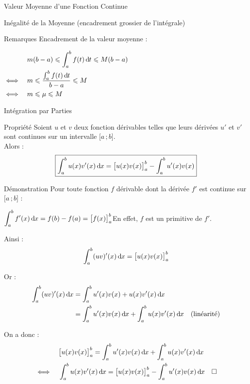 \documentclass{coursbook}
\begin{document}
\begin{Gpartie}{Valeur Moyenne d'une Fonction Continue}
\begin{Spartie}{Inégalité de la Moyenne (encadrement \og grossier \fg{} de l'intégrale)}
\begin{SSpartie}{Remarques}
                Encadrement de la valeur moyenne :

                $\begin{aligned}[t]
                    &\quad m(b-a)\leq\int_a^b f(t)\dt \leq M(b-a) \\
                    \iff&\quad m\leq\frac{\int_a^b f(t)\dt}{b-a}\leq M \\
                    \iff&\quad m\leq\mu\leq M
                \end{aligned}$
            \end{SSpartie}
        \end{Spartie}
    \end{Gpartie}
    \vfill
    \pagebreak
    \begin{Gpartie}{Intégration par Parties} 
        \begin{Spartie}{Propriété} 
            Soient $u$ et $v$ deux fonction dérivables telles que leurs dérivées $u'$ et $v'$ sont continues sur un intervalle $\big[a\,; b\big]$. \\ Alors : \[\boxed{\int_a^b u(x)v'(x)\,\mathrm{d}\hspace*{-0.05em}x=\big[u(x)v(x)\big]_a^b-\int_a^b u'(x)v(x)}\]
            \begin{SSpartie}{Démonstration} 
                Pour toute fonction $f$ dérivable dont la dérivée $f'$ est continue sur $\big[a\,; b\big]$ :

                $\displaystyle \int_a^b f'(x)\,\mathrm{d}\hspace*{-0.05em}x=f(b)-f(a)=\big[f(x)\big]_a^b$\quad En effet, $f$ est un primitive de $f'$.

                Ainsi : \[\displaystyle \int_a^b (u v)'(x)\,\mathrm{d}\hspace*{-0.05em}x=\big[u(x)v(x)\big]_a^b\]

                Or : 
                \[\begin{aligned}[t]
                    \int_a^b (u v)'(x)\,\mathrm{d}\hspace*{-0.05em}x &= \int_a^b u'(x)v(x)+u(x)v'(x)\,\mathrm{d}\hspace*{-0.05em}x \\
                    &=\int_a^b u'(x)v(x)\,\mathrm{d}\hspace*{-0.05em}x + \int_a^b u(x)v'(x)\,\mathrm{d}\hspace*{-0.05em}x\quad\text{(linéarité)}
                \end{aligned}\]

                On a donc :
                \[\begin{aligned}[t]
                    &\quad\big[u(x)v(x)\big]_a^b = \int_a^b u'(x)v(x)\,\mathrm{d}\hspace*{-0.05em}x + \int_a^b u(x)v'(x)\,\mathrm{d}\hspace*{-0.05em}x \\
                    \iff&\quad\int_a^b u(x)v'(x)\,\mathrm{d}\hspace*{-0.05em}x=\big[u(x)v(x)\big]_a^b-\int_a^b u'(x)v(x)\,\mathrm{d}\hspace*{-0.05em}x\quad\square
                \end{aligned}\]
            \end{SSpartie}
        \end{Spartie}
    \end{Gpartie}
\end{document}

